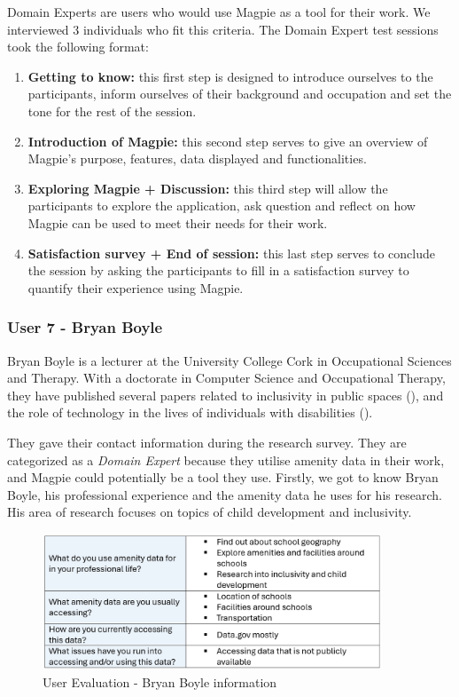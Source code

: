 Domain Experts are users who would use Magpie as a tool for their work. We
interviewed 3 individuals who fit this criteria. The Domain Expert test sessions
took the following format:
\begin{enumerate}
    \item \textbf{Getting to know:} this first step is designed to introduce
          ourselves to the participants, inform ourselves of their background and
          occupation and set the tone for the rest of the session.
    \item \textbf{Introduction of Magpie:} this second step serves to give an
          overview of Magpie's purpose, features, data displayed and functionalities.
    \item \textbf{Exploring Magpie + Discussion:} this third step will allow the
          participants to explore the application, ask question and reflect on how
          Magpie can be used to meet their needs for their work.
    \item \textbf{Satisfaction survey + End of session:} this last step serves
          to conclude the session by asking the participants to fill in a satisfaction
          survey to quantify their experience using Magpie.
\end{enumerate}

\subsubsection{User 7 - Bryan Boyle}
Bryan Boyle is a lecturer at the University College Cork in Occupational
Sciences and Therapy. With a doctorate in Computer Science and Occupational
Therapy, they have published several papers related to inclusivity in public
spaces (\cite{bryanboyleplaygroundinclusion2023}), and the role of technology in
the lives of individuals with disabilities
(\cite{bryanboylechildrenautism2022}).

They gave their contact information during the research survey. They are
categorized as a \emph{Domain Expert} because they utilise amenity data in their
work, and Magpie could potentially be a tool they use. Firstly, we got to know
Bryan Boyle, his professional experience and the amenity data he uses for his
research. His area of research focuses on topics of child development and
inclusivity.
\begin{figure}[h!]
    \centering
    \includegraphics[width=0.9\textwidth]{images/bryan-amenity-info.png}
    \caption{User Evaluation - Bryan Boyle information}
\end{figure}

